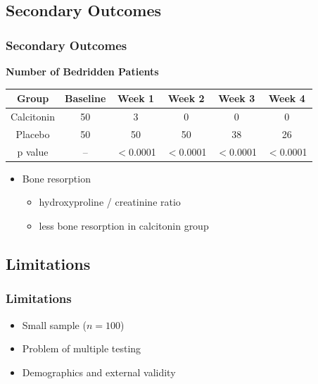 \documentclass{beamer}
\begin{document}
\subsection{Secondary Outcomes}
\begin{frame}
	\frametitle{Secondary Outcomes}
	\textbf{Number of Bedridden Patients}
	\begin{center}
		\begin{tabular}{|c||c|c|c|c|c|}
			\hline
			Group & Baseline & Week 1 & Week 2 & Week 3 & Week 4
			\\
			\hline
			Calcitonin & 50 & 3 & 0 & 0 & 0
			\\
			\hline
			Placebo & 50 & 50 & 50 & 38 & 26
			\\
			\hline
			p value & -- & $<$0.0001 & $<$0.0001 & $<$0.0001 & $<$0.0001
			\\
			\hline
		\end{tabular}
	\pause
	\begin{itemize}
			\item Bone resorption
				\begin{itemize}
					\item hydroxyproline / creatinine ratio
					\item less bone resorption in calcitonin group
				\end{itemize}
	\end{itemize}
	\end{center}
\end{frame}
\subsection{Limitations}
\begin{frame}
	\frametitle{Limitations}
	\begin{itemize}
		\item Small sample ($n=100$)
		\item Problem of multiple testing
		\item Demographics and external validity
	\end{itemize}
\end{frame}
\end{document}

